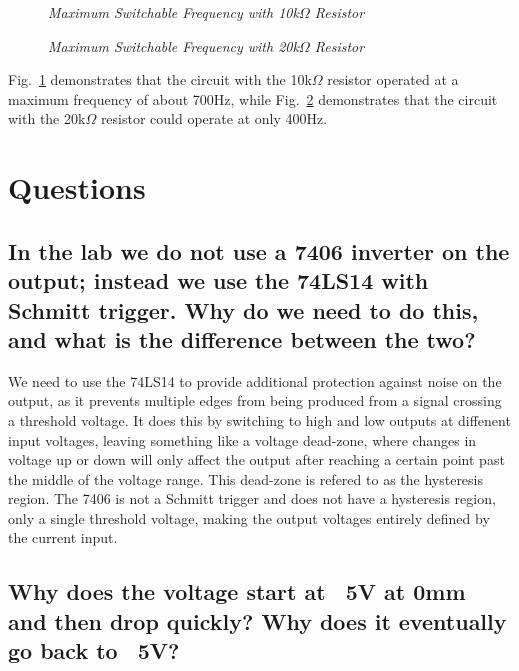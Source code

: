 \documentclass[conference]{IEEEtran}
\begin{document}
\begin{figure}[!ht]
    \centering
    \caption{\textit{Maximum Switchable Frequency with 10k$\Omega$ Resistor}}
    \label{fig:maxFreq10k}
\end{figure}

\begin{figure}[!ht]
    \centering
    \caption{\textit{Maximum Switchable Frequency with 20k$\Omega$ Resistor}}
    \label{fig:maxFreq20k}
\end{figure}

Fig.~\ref{fig:maxFreq10k} demonstrates that the circuit with the 10k$\Omega$
resistor operated at a maximum frequency of about 700Hz, while Fig.~\ref{fig:maxFreq20k}
demonstrates that the circuit with the 20k$\Omega$ resistor could operate at only 400Hz.

\section{Questions}

\subsection{In the lab we do not use a 7406 inverter on the output; instead we use the 74LS14 with Schmitt
trigger. Why do we need to do this, and what is the difference between the two?}

We need to use the 74LS14 to provide additional protection against noise on the output, as it
prevents multiple edges from being produced from a signal crossing a threshold voltage. It does this
by switching to high and low outputs at diffenent input voltages, leaving something like a voltage dead-zone,
where changes in voltage up or down will only affect the output after reaching a certain point past the middle
of the voltage range. This dead-zone is refered to as the hysteresis region. The 7406 is not a Schmitt trigger
and does not have a hysteresis region, only a single threshold voltage, making the output voltages entirely
defined by the current input.

\subsection{Why does the voltage start at ~5V at 0mm and then drop quickly? Why does it eventually go
back to ~5V?}
\end{document}
